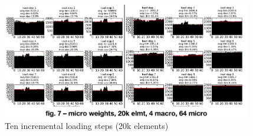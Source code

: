 \begin{figure}
  \begin{center}
    \includegraphics[height=2in]{siam_cse_ten.png}
  \end{center}
  \caption{\small Ten incremental loading steps (20k elements)}
  \label{10_step_lb}
\end{figure}